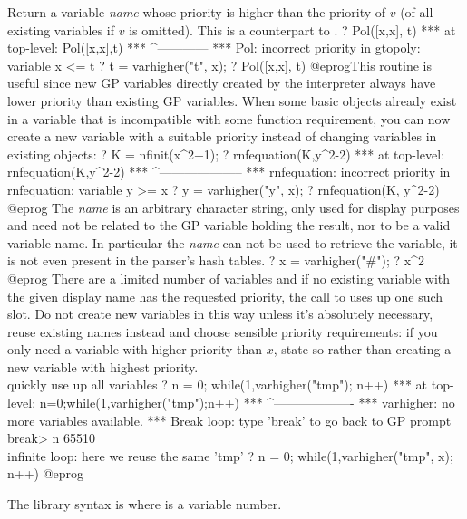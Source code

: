 \label{se:varhigher}
Return a variable \emph{name} whose priority is higher
than the priority of $v$ (of all existing variables if $v$ is omitted).
This is a counterpart to .
\bprog
? Pol([x,x], t)
 ***   at top-level: Pol([x,x],t)
 ***                 ^------------
 *** Pol: incorrect priority in gtopoly: variable x <= t
? t = varhigher("t", x);
? Pol([x,x], t)
@eprog\noindent This routine is useful since new GP variables directly
created by the interpreter always have lower priority than existing
GP variables. When some basic objects already exist in a variable
that is incompatible with some function requirement, you can now
create a new variable with a suitable priority instead of changing variables
in existing objects:
\bprog
? K = nfinit(x^2+1);
? rnfequation(K,y^2-2)
 ***   at top-level: rnfequation(K,y^2-2)
 ***                 ^--------------------
 *** rnfequation: incorrect priority in rnfequation: variable y >= x
? y = varhigher("y", x);
? rnfequation(K, y^2-2)
@eprog\noindent
{}
The \emph{name} is an arbitrary character string, only used for display
purposes and need not be related to the GP variable holding the result, nor
to be a valid variable name. In particular the \emph{name} can
not be used to retrieve the variable, it is not even present in the parser's
hash tables.
\bprog
? x = varhigher("#");
? x^2
@eprog
 There are a limited number of variables and if no
existing variable with the given display name has the requested
priority, the call to  uses up one such slot. Do not create
new variables in this way unless it's absolutely necessary,
reuse existing names instead and choose sensible priority requirements:
if you only need a variable with higher priority than $x$, state so
rather than creating a new variable with highest priority.
\bprog
\\ quickly use up all variables
? n = 0; while(1,varhigher("tmp"); n++)
 ***   at top-level: n=0;while(1,varhigher("tmp");n++)
 ***                             ^-------------------
 *** varhigher: no more variables available.
 ***   Break loop: type 'break' to go back to GP prompt
break> n
65510
\\ infinite loop: here we reuse the same 'tmp'
? n = 0; while(1,varhigher("tmp", x); n++)
@eprog

The library syntax is  where  is a variable number.

